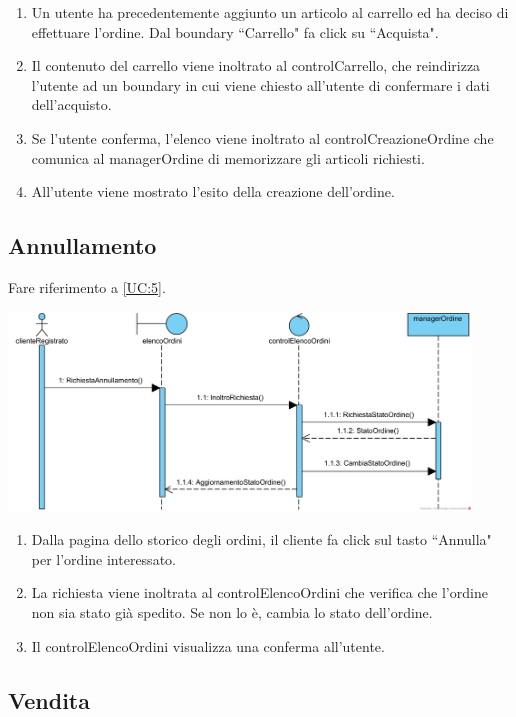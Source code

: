 \documentclass[12pt,a4paper]{article}
\begin{document}
\begin{enumerate}
\item Un utente ha precedentemente aggiunto un articolo al carrello ed ha deciso di effettuare l'ordine. Dal boundary ``Carrello" fa click su ``Acquista".
\item Il contenuto del carrello viene inoltrato al controlCarrello, che reindirizza l'utente ad un boundary in cui viene chiesto all'utente di confermare i dati dell'acquisto.
\item Se l'utente conferma, l'elenco viene inoltrato al controlCreazioneOrdine che comunica al managerOrdine di memorizzare gli articoli richiesti.
\item All'utente viene mostrato l'esito della creazione dell'ordine.
\end{enumerate}

\newpage

\subsection{Annullamento}

Fare riferimento a \ref{UC:5}.

\includegraphics[height=200px]{SequenceDiagram/Annullamento}

\begin{enumerate}
\item Dalla pagina dello storico degli ordini, il cliente fa click sul tasto ``Annulla" per l'ordine interessato.
\item La richiesta viene inoltrata al controlElencoOrdini che verifica che l'ordine non sia stato già spedito. Se non lo è, cambia lo stato dell'ordine.
\item Il controlElencoOrdini visualizza una conferma all'utente.
\end{enumerate}

\subsection{Vendita}
\end{document}
